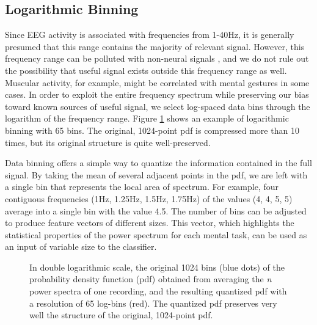 \subsection{Logarithmic Binning}

Since EEG activity is associated with frequencies from 1-40Hz, it is generally presumed that this range contains the majority of relevant signal. However, this frequency range can be polluted with non-neural signals \cite{ball2009signal}, and we do not rule out the possibility that useful signal exists outside this frequency range as well. Muscular activity, for example, might be correlated with mental gestures in some cases. In order to exploit the entire frequency spectrum while preserving our bias toward known sources of useful signal, we select log-spaced data bins through the logarithm of the frequency range. Figure \ref{binnedEEGpowerspec} shows an example of logarithmic binning with 65 bins. The original, 1024-point pdf is compressed more than 10 times, but its original structure is quite well-preserved.

Data binning offers a simple way to quantize the information contained in the full signal. By taking the mean of several adjacent points in the pdf, we are left with a single bin that represents the local area of spectrum. For example, four contiguous frequencies (1Hz, 1.25Hz, 1.5Hz, 1.75Hz) of the values (4, 4, 5, 5) average into a single bin with the value 4.5. The number of bins can be adjusted to produce feature vectors of different sizes. This vector, which highlights the statistical properties of the power spectrum for each mental task, can be used as an input of variable size to the classifier.

\begin{figure}[!h]
  \vspace{-0.2cm}
  \centering
  {}
\caption{In double logarithmic scale, the original 1024 bins (blue dots) of the probability density function (pdf) obtained from averaging the \emph{n} power spectra of one recording, and the resulting quantized pdf with a resolution of 65 log-bins (red). The quantized pdf preserves very well the structure of the original, 1024-point pdf. }
\label{binnedEEGpowerspec}
\vspace{-0.1cm}
\end{figure}



